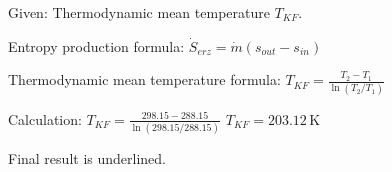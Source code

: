 Given: Thermodynamic mean temperature \( T_{KF} \).  

Entropy production formula:  
\( \dot{S}_{erz} = \dot{m} (s_{out} - s_{in}) \)  

Thermodynamic mean temperature formula:  
\( T_{KF} = \frac{T_2 - T_1}{\ln(T_2 / T_1)} \)  

Calculation:  
\( T_{KF} = \frac{298.15 - 288.15}{\ln(298.15 / 288.15)} \)  
\( T_{KF} = 203.12 \, \text{K} \)  

Final result is underlined.